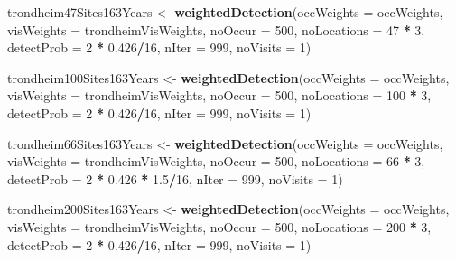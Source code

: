 \documentclass[]{article}
\newenvironment{Shaded}{\begin{snugshade}}{\end{snugshade}}
\newcommand{\KeywordTok}[1]{\textcolor[rgb]{0.13,0.29,0.53}{\textbf{#1}}}
\newcommand{\DataTypeTok}[1]{\textcolor[rgb]{0.13,0.29,0.53}{#1}}
\newcommand{\DecValTok}[1]{\textcolor[rgb]{0.00,0.00,0.81}{#1}}
\newcommand{\FloatTok}[1]{\textcolor[rgb]{0.00,0.00,0.81}{#1}}
\newcommand{\StringTok}[1]{\textcolor[rgb]{0.31,0.60,0.02}{#1}}
\newcommand{\OperatorTok}[1]{\textcolor[rgb]{0.81,0.36,0.00}{\textbf{#1}}}
\newcommand{\NormalTok}[1]{#1}
\begin{document}
\begin{Shaded}
\begin{Highlighting}[]
\NormalTok{trondheim47Sites163Years <-}\StringTok{ }\KeywordTok{weightedDetection}\NormalTok{(}\DataTypeTok{occWeights =}\NormalTok{ occWeights, }\DataTypeTok{visWeights =}\NormalTok{ trondheimVisWeights, }
    \DataTypeTok{noOccur =} \DecValTok{500}\NormalTok{, }\DataTypeTok{noLocations =} \DecValTok{47} \OperatorTok{*}\StringTok{ }\DecValTok{3}\NormalTok{, }\DataTypeTok{detectProb =} \DecValTok{2} \OperatorTok{*}\StringTok{ }\FloatTok{0.426}\OperatorTok{/}\DecValTok{16}\NormalTok{, }\DataTypeTok{nIter =} \DecValTok{999}\NormalTok{, }
    \DataTypeTok{noVisits =} \DecValTok{1}\NormalTok{)}

\NormalTok{trondheim100Sites163Years <-}\StringTok{ }\KeywordTok{weightedDetection}\NormalTok{(}\DataTypeTok{occWeights =}\NormalTok{ occWeights, }\DataTypeTok{visWeights =}\NormalTok{ trondheimVisWeights, }
    \DataTypeTok{noOccur =} \DecValTok{500}\NormalTok{, }\DataTypeTok{noLocations =} \DecValTok{100} \OperatorTok{*}\StringTok{ }\DecValTok{3}\NormalTok{, }\DataTypeTok{detectProb =} \DecValTok{2} \OperatorTok{*}\StringTok{ }\FloatTok{0.426}\OperatorTok{/}\DecValTok{16}\NormalTok{, }\DataTypeTok{nIter =} \DecValTok{999}\NormalTok{, }
    \DataTypeTok{noVisits =} \DecValTok{1}\NormalTok{)}


\NormalTok{trondheim66Sites163Years <-}\StringTok{ }\KeywordTok{weightedDetection}\NormalTok{(}\DataTypeTok{occWeights =}\NormalTok{ occWeights, }\DataTypeTok{visWeights =}\NormalTok{ trondheimVisWeights, }
    \DataTypeTok{noOccur =} \DecValTok{500}\NormalTok{, }\DataTypeTok{noLocations =} \DecValTok{66} \OperatorTok{*}\StringTok{ }\DecValTok{3}\NormalTok{, }\DataTypeTok{detectProb =} \DecValTok{2} \OperatorTok{*}\StringTok{ }\FloatTok{0.426} \OperatorTok{*}\StringTok{ }\FloatTok{1.5}\OperatorTok{/}\DecValTok{16}\NormalTok{, }\DataTypeTok{nIter =} \DecValTok{999}\NormalTok{, }
    \DataTypeTok{noVisits =} \DecValTok{1}\NormalTok{)}

\NormalTok{trondheim200Sites163Years <-}\StringTok{ }\KeywordTok{weightedDetection}\NormalTok{(}\DataTypeTok{occWeights =}\NormalTok{ occWeights, }\DataTypeTok{visWeights =}\NormalTok{ trondheimVisWeights, }
    \DataTypeTok{noOccur =} \DecValTok{500}\NormalTok{, }\DataTypeTok{noLocations =} \DecValTok{200} \OperatorTok{*}\StringTok{ }\DecValTok{3}\NormalTok{, }\DataTypeTok{detectProb =} \DecValTok{2} \OperatorTok{*}\StringTok{ }\FloatTok{0.426}\OperatorTok{/}\DecValTok{16}\NormalTok{, }\DataTypeTok{nIter =} \DecValTok{999}\NormalTok{, }
    \DataTypeTok{noVisits =} \DecValTok{1}\NormalTok{)}


\end{Highlighting}
\end{Shaded}
\end{document}
